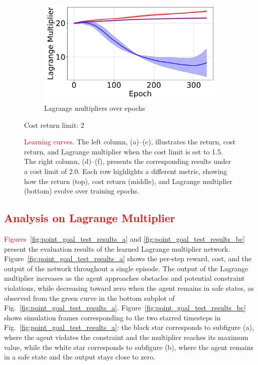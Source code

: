 \begin{figure}[H]
\begin{minipage}{0.48\textwidth}
        \begin{subfigure}{\linewidth}
            \centering
            \includegraphics[width=\linewidth]{figure/PointGoal/limit 2/lagrange.pdf}
            \caption{Lagrange multipliers over epochs}
        \end{subfigure}

        \caption*{Cost return limit: 2}
    \end{minipage}

    \caption{\textcolor{red}{Learning curves.} 
            The left column, (a)–(c), illustrates the return, cost return, and Lagrange multiplier when the cost limit is set to 1.5. 
            The right column, (d)–(f), presents the corresponding results under a cost limit of 2.0. 
            Each row highlights a different metric, showing how the return (top), cost return (middle), and Lagrange multiplier (bottom) evolve over training epochs.}
    \label{fig:point_goal_results_vertical2}
\end{figure}

\subsection{\textcolor{red}{Analysis on Lagrange Multiplier}}

\textcolor{red}{Figures}~\ref{fig:point_goal_test_results_a} and \ref{fig:point_goal_test_results_bc} present the evaluation results of the learned Lagrange multiplier network. 
Figure~\ref{fig:point_goal_test_results_a} shows the per-step reward, cost, and the output of the network throughout a single episode. 
The output of the Lagrange multiplier increases as the agent approaches obstacles and potential constraint violations, while decreasing toward zero when the agent remains in safe states, as observed from the green curve in the bottom subplot of Fig.~\ref{fig:point_goal_test_results_a}.
Figure~\ref{fig:point_goal_test_results_bc} shows simulation frames corresponding to the two starred timesteps in Fig.~\ref{fig:point_goal_test_results_a}: the black star corresponds to subfigure (a), where the agent violates the constraint and the multiplier reaches its maximum value, while the white star corresponds to subfigure (b), where the agent remains in a safe state and the output stays close to zero.

